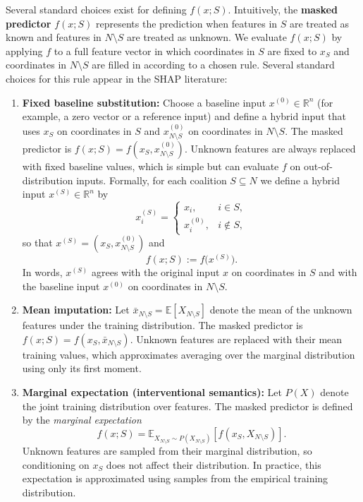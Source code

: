 \documentclass{article}
\begin{document}
Several standard choices exist for defining $f(x; S)$. Intuitively, the \textbf{masked predictor} $f(x; S)$ represents the prediction when features in $S$ are treated as known and features in $N \setminus S$ are treated as unknown.
We evaluate $f(x; S)$ by applying $f$ to a full feature vector in which coordinates in $S$ are fixed to $x_S$ and coordinates in $N \setminus S$ are filled in according to a chosen rule.
Several standard choices for this rule appear in the SHAP literature:

\begin{enumerate}
    \item \textbf{Fixed baseline substitution:} Choose a baseline input $x^{(0)} \in \mathbb{R}^n$ (for example, a zero vector or a reference input) and define a hybrid input that uses $x_S$ on coordinates in $S$ and $x^{(0)}_{N \setminus S}$ on coordinates in $N \setminus S$.
    The masked predictor is $f(x; S) = f(x_S, x^{(0)}_{N \setminus S})$.
    Unknown features are always replaced with fixed baseline values, which is simple but can evaluate $f$ on out-of-distribution inputs.
    Formally, for each coalition $S \subseteq N$ we define a hybrid input $x^{(S)} \in \mathbb{R}^n$ by
    \[
    x_i^{(S)} =
    \begin{cases}
      x_i, & i \in S, \\
      x_i^{(0)}, & i \notin S,
    \end{cases}
    \]
    so that $x^{(S)} = (x_S, x^{(0)}_{N \setminus S})$ and
    \[
    f(x; S) := f\bigl(x^{(S)}\bigr).
    \]
    In words, $x^{(S)}$ agrees with the original input $x$ on coordinates in $S$ and with the baseline input $x^{(0)}$ on coordinates in $N \setminus S$.

    \item \textbf{Mean imputation:} Let $\bar{x}_{N \setminus S} = \mathbb{E}[X_{N \setminus S}]$ denote the mean of the unknown features under the training distribution.
    The masked predictor is $f(x; S) = f(x_S, \bar{x}_{N \setminus S})$.
    Unknown features are replaced with their mean training values, which approximates averaging over the marginal distribution using only its first moment.

    \item \textbf{Marginal expectation (interventional semantics):} Let $P(X)$ denote the joint training distribution over features.
    The masked predictor is defined by the \emph{marginal expectation}
    \[
    f(x; S) = \mathbb{E}_{X_{N \setminus S} \sim P(X_{N \setminus S})}\!\left[f(x_S, X_{N \setminus S})\right].
    \]
    Unknown features are sampled from their marginal distribution, so conditioning on $x_S$ does not affect their distribution.
    In practice, this expectation is approximated using samples from the empirical training distribution.


\end{enumerate}
\end{document}
